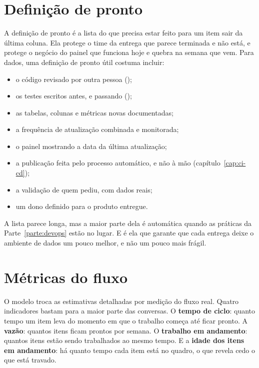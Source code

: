 \section{Definição de pronto}
\label{sec:definicao-pronto}

A definição de pronto é a lista do que precisa estar feito para um item sair da última coluna.
Ela protege o time da entrega que parece terminada e não está, e protege o negócio do painel
que funciona hoje e quebra na semana que vem. Para dados, uma definição de pronto útil
costuma incluir:

\begin{itemize}
  \item o código revisado por outra pessoa ();
  \item os testes escritos antes, e passando ();
  \item as tabelas, colunas e métricas novas documentadas;
  \item a frequência de atualização combinada e monitorada;
  \item o painel mostrando a data da última atualização;
  \item a publicação feita pelo processo automático, e não à mão (capítulo~\ref{cap:ci-cd});
  \item a validação de quem pediu, com dados reais;
  \item um dono definido para o produto entregue.
\end{itemize}

A lista parece longa, mas a maior parte dela é automática quando as práticas da
Parte~\ref{parte:devops} estão no lugar. E é ela que garante que cada entrega deixe o
ambiente de dados um pouco melhor, e não um pouco mais frágil.

\section{Métricas do fluxo}
\label{sec:metricas-fluxo}

O modelo troca as estimativas detalhadas por medição do fluxo real. Quatro indicadores
bastam para a maior parte das conversas. O \textbf{tempo de ciclo}: quanto tempo um item leva
do momento em que o trabalho começa até ficar pronto. A \textbf{vazão}: quantos itens ficam
prontos por semana. O \textbf{trabalho em andamento}: quantos itens estão sendo trabalhados ao
mesmo tempo. E a \textbf{idade dos itens em andamento}: há quanto tempo cada item está no
quadro, o que revela cedo o que está travado.


